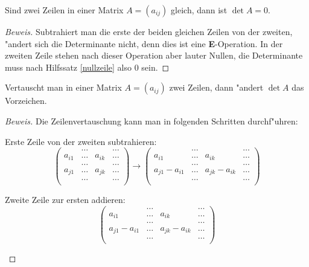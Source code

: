 \begin{hilfssatz}
Sind zwei Zeilen in einer Matrix $A=(a_{ij})$
gleich, dann ist $\det A=0$.
\end{hilfssatz}
\begin{proof}[Beweis]
Subtrahiert man die erste der beiden gleichen Zeilen von der
zweiten, "andert sich die Determinante nicht, denn dies ist eine
{\bf E}-Operation.
In der zweiten Zeile stehen nach dieser Operation
aber lauter Nullen, die Determinante muss nach Hilfssatz \ref{nullzeile}
also $0$ sein.
\end{proof}

\begin{hilfssatz}
Vertauscht man in einer Matrix $A=(a_{ij})$ zwei
Zeilen, dann "andert $\det A$ das Vorzeichen.
\end{hilfssatz}
\begin{proof}[Beweis]
Die Zeilenvertauschung kann man in folgenden Schritten durchf"uhren:
\begin{compactenum}
\item Erste Zeile von der zweiten subtrahieren:
\[
\begin{pmatrix}
      &\dots&      &\dots\\
a_{i1}&\dots&a_{ik}&\dots\\
      &\dots&      &\dots\\
a_{j1}&\dots&a_{jk}&\dots\\
      &\dots&      &\dots\\
\end{pmatrix}
\rightarrow
\begin{pmatrix}
             &\dots&             &\dots\\
a_{i1}       &\dots&a_{ik}       &\dots\\
             &\dots&             &\dots\\
a_{j1}-a_{i1}&\dots&a_{jk}-a_{ik}&\dots\\
             &\dots&             &\dots\\
\end{pmatrix}
\]
\item Zweite Zeile zur ersten addieren:
\[
\begin{pmatrix}
             &\dots&             &\dots\\
a_{i1}       &\dots&a_{ik}       &\dots\\
             &\dots&             &\dots\\
a_{j1}-a_{i1}&\dots&a_{jk}-a_{ik}&\dots\\
             &\dots&             &\dots\\

\end{pmatrix}\]
\end{compactenum}
\end{proof}
